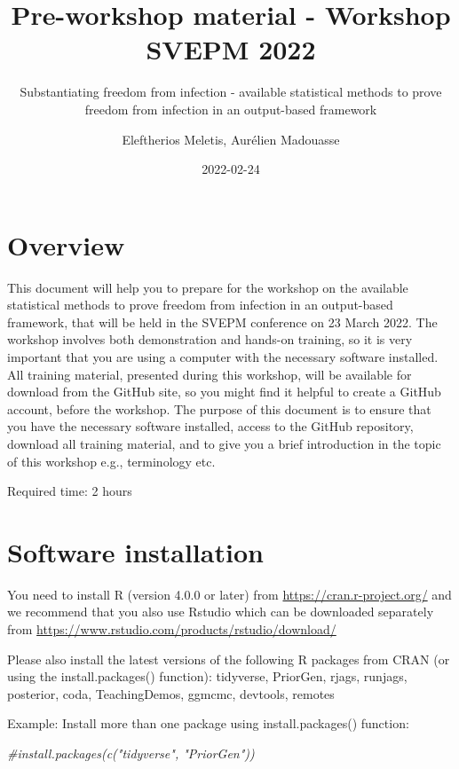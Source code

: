 \documentclass[
  12pt,
]{article}
\title{Pre-workshop material - Workshop SVEPM 2022}
\subtitle{Substantiating freedom from infection - available statistical
methods to prove freedom from infection in an output-based framework}
\author{Eleftherios Meletis, Aurélien Madouasse}
\date{2022-02-24}
\newenvironment{Shaded}{\begin{snugshade}}{\end{snugshade}}
\newcommand{\CommentTok}[1]{\textcolor[rgb]{0.56,0.35,0.01}{\textit{#1}}}
\begin{document}
\maketitle

\hypertarget{overview}{%
\section{Overview}\label{overview}}

This document will help you to prepare for the workshop on the available
statistical methods to prove freedom from infection in an output-based
framework, that will be held in the SVEPM conference on 23 March 2022.
The workshop involves both demonstration and hands-on training, so it is
very important that you are using a computer with the necessary software
installed. All training material, presented during this workshop, will
be available for download from the GitHub site, so you might find it
helpful to create a GitHub account, before the workshop. The purpose of
this document is to ensure that you have the necessary software
installed, access to the GitHub repository, download all training
material, and to give you a brief introduction in the topic of this
workshop e.g., terminology etc.

Required time: 2 hours

\hypertarget{software-installation}{%
\section{Software installation}\label{software-installation}}

You need to install R (version 4.0.0 or later) from
\url{https://cran.r-project.org/} and we recommend that you also use
Rstudio which can be downloaded separately from
\url{https://www.rstudio.com/products/rstudio/download/}

Please also install the latest versions of the following R packages from
CRAN (or using the install.packages() function): tidyverse, PriorGen,
rjags, runjags, posterior, coda, TeachingDemos, ggmcmc, devtools,
remotes

Example: Install more than one package using install.packages()
function:

\begin{Shaded}
\begin{Highlighting}[]
\CommentTok{\#install.packages(c("tidyverse", "PriorGen"))}
\end{Highlighting}
\end{Shaded}
\end{document}
